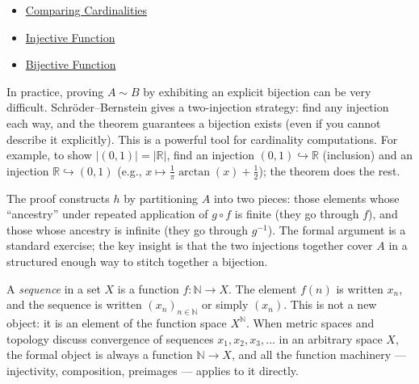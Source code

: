 \begin{dependencies}
\begin{itemize}
  \item \hyperref[def:cardinality-order]{Comparing Cardinalities}
  \item \hyperref[def:injective]{Injective Function}
  \item \hyperref[def:bijective]{Bijective Function}
\end{itemize}
\end{dependencies}

\begin{remark*}
In practice, proving $A \sim B$ by exhibiting an explicit bijection can be
very difficult. Schröder--Bernstein gives a two-injection strategy: find any
injection each way, and the theorem guarantees a bijection exists (even if
you cannot describe it explicitly). This is a powerful tool for cardinality
computations. For example, to show $|(0,1)| = |\mathbb{R}|$, find an
injection $(0,1) \hookrightarrow \mathbb{R}$ (inclusion) and an injection
$\mathbb{R} \hookrightarrow (0,1)$ (e.g., $x \mapsto \frac{1}{\pi}
\arctan(x) + \frac{1}{2}$); the theorem does the rest.
\end{remark*}

\begin{remark*}
The proof constructs $h$ by partitioning $A$ into two pieces: those elements
whose ``ancestry'' under repeated application of $g \circ f$ is finite (they
go through $f$), and those whose ancestry is infinite (they go through
$g^{-1}$). The formal argument is a standard exercise; the key insight is that
the two injections together cover $A$ in a structured enough way to stitch
together a bijection.
\end{remark*}

\begin{remark*}
\label{rem:sequences-as-functions}
A \emph{sequence} in a set $X$ is a function $f : \mathbb{N} \to X$. The
element $f(n)$ is written $x_n$, and the sequence is written $(x_n)_{n \in
\mathbb{N}}$ or simply $(x_n)$. This is not a new object: it is an element
of the function space $X^{\mathbb{N}}$. When metric spaces and topology
discuss convergence of sequences $x_1, x_2, x_3, \dots$ in an arbitrary space
$X$, the formal object is always a function $\mathbb{N} \to X$, and all the
function machinery — injectivity, composition, preimages — applies to it
directly.
\end{remark*}


